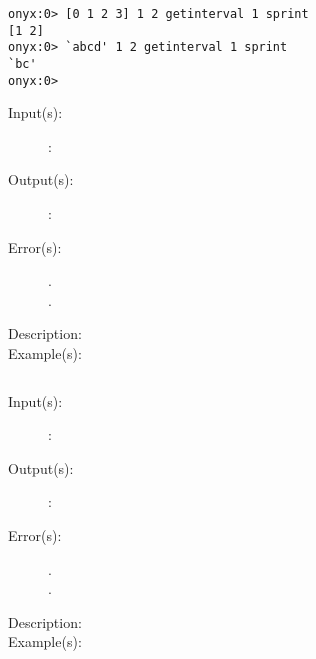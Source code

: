 \begin{description}
\begin{description}
\begin{verbatim}
onyx:0> [0 1 2 3] 1 2 getinterval 1 sprint
[1 2]
onyx:0> `abcd' 1 2 getinterval 1 sprint
`bc'
onyx:0>
		\end{verbatim}
	\end{description}
\label{systemdict:getpgid}
\item[{\onyxop{OPARGS}{getpgid}{OPOUTS}}: ]
	\begin{description}\item[]
	\item[Input(s): ]
		\begin{description}\item[]
		\item[: ]
		\end{description}
	\item[Output(s): ]
		\begin{description}\item[]
		\item[: ]
		\end{description}
	\item[Error(s): ]
		\begin{description}\item[]
		\item[.]
		\item[.]
		\end{description}
	\item[Description: ]
	\item[Example(s): ]\begin{verbatim}

		\end{verbatim}
	\end{description}
\label{systemdict:getsid}
\item[{\onyxop{OPARGS}{getsid}{OPOUTS}}: ]
	\begin{description}\item[]
	\item[Input(s): ]
		\begin{description}\item[]
		\item[: ]
		\end{description}
	\item[Output(s): ]
		\begin{description}\item[]
		\item[: ]
		\end{description}
	\item[Error(s): ]
		\begin{description}\item[]
		\item[.]
		\item[.]
		\end{description}
	\item[Description: ]
	\item[Example(s): ]\begin{verbatim}


\end{verbatim}
\end{description}
\end{description}
